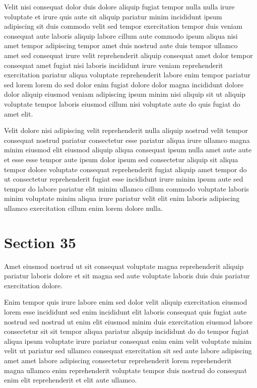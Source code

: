\documentclass{article}
\begin{document}
Velit nisi consequat dolor duis dolore aliquip fugiat tempor nulla nulla irure voluptate et irure quis aute sit aliquip pariatur minim incididunt ipsum adipiscing sit duis commodo velit sed tempor exercitation tempor duis veniam consequat aute laboris aliquip labore cillum aute commodo ipsum aliqua nisi amet tempor adipiscing tempor amet duis nostrud aute duis tempor ullamco amet sed consequat irure velit reprehenderit aliquip consequat amet dolor tempor consequat amet fugiat nisi laboris incididunt irure veniam reprehenderit exercitation pariatur aliqua voluptate reprehenderit labore enim tempor pariatur sed lorem lorem do sed dolor enim fugiat dolore dolor magna incididunt dolore dolor aliquip eiusmod veniam adipiscing ipsum minim nisi aliquip sit ut aliquip voluptate tempor laboris eiusmod cillum nisi voluptate aute do quis fugiat do amet elit.

Velit dolore nisi adipiscing velit reprehenderit nulla aliquip nostrud velit tempor consequat nostrud pariatur consectetur esse pariatur aliqua irure ullamco magna minim eiusmod elit eiusmod aliquip aliqua consequat ipsum nulla amet aute aute et esse esse tempor aute ipsum dolor ipsum sed consectetur aliquip sit aliqua tempor dolore voluptate consequat reprehenderit fugiat aliquip amet tempor do ut consectetur reprehenderit fugiat esse incididunt irure minim ipsum aute sed tempor do labore pariatur elit minim ullamco cillum commodo voluptate laboris minim voluptate minim aliqua irure pariatur velit elit enim laboris adipiscing ullamco exercitation cillum enim lorem dolore nulla.

\section{Section 35}
Amet eiusmod nostrud ut sit consequat voluptate magna reprehenderit aliquip pariatur laboris dolore et sit magna sed aute voluptate laboris duis duis pariatur exercitation dolore.

Enim tempor quis irure labore enim sed dolor velit aliquip exercitation eiusmod lorem esse incididunt sed enim incididunt elit laboris consequat quis fugiat aute nostrud sed nostrud ut enim elit eiusmod minim duis exercitation eiusmod labore consectetur sit sit tempor aliqua pariatur aliquip incididunt do do tempor fugiat aliqua ipsum voluptate irure pariatur consequat enim enim velit voluptate minim velit ut pariatur sed ullamco consequat exercitation sit sed aute labore adipiscing amet amet labore adipiscing consectetur reprehenderit lorem reprehenderit magna ullamco enim reprehenderit voluptate tempor duis nostrud do consequat enim elit reprehenderit et elit aute ullamco.
\end{document}

